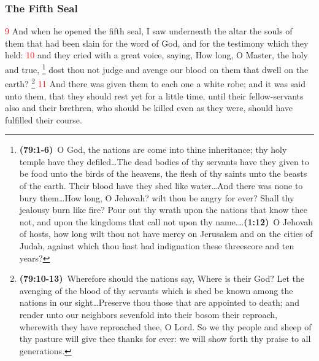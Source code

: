 \documentclass[12pt,twoside]{memoir}
\newcommand{\cbibleref}[3]{\textbf{\ibibleverse{#1}(#2)}\ {#3}}
\newcommand{\cbiblefootduo}[6]{\footnote{\cbibleref{#1}{#2}{#3}\ldots \cbibleref{#4}{#5}{#6}}}
\newcommand{\vnum}[1]{\textcolor{red}{\normalsize{#1}}}
\begin{document}
\subsubsection*{The Fifth Seal}
\vnum{9} And when he opened the fifth seal, I saw underneath the altar the souls of them that had been slain for the word of God, and for the testimony which they held: %
\vnum{10} and they cried with a great voice, saying, How long, O Master, the holy and true,%
	\cbiblefootduo{Psalms}{79:1-6}{O God, the nations are come into thine inheritance; thy holy temple have they defiled\ldots The dead bodies of thy servants have they given to be food unto the birds of the heavens, the flesh of thy saints unto the beasts of the earth. Their blood have they shed like water\ldots And there was none to bury them\ldots How long, O Jehovah? wilt thou be angry for ever? Shall thy jealousy burn like fire? Pour out thy wrath upon the nations that know thee not, and upon the kingdoms that call not upon thy name.}%
				{Zechariah}{1:12}{O Jehovah of hosts, how long wilt thou not have mercy on Jerusalem and on the cities of Judah, against which thou hast had indignation these threescore and ten years?}
 dost thou not judge and avenge our blood on them that dwell on the earth?%
 	\footnote{\cbibleref{Psalms}{79:10-13}{Wherefore should the nations say, Where is their God? Let the avenging of the blood of thy servants which is shed be known among the nations in our sight\ldots Preserve thou those that are appointed to death; and render unto our neighbors sevenfold into their bosom their reproach, wherewith they have reproached thee, O Lord. So we thy people and sheep of thy pasture will give thee thanks for ever: we will show forth thy praise to all generations.}
 	} %
\vnum{11} And there was given them to each one a white robe; and it was said unto them, that they should rest yet for a little time, until their fellow-servants also and their brethren, who should be killed even as they were, should have fulfilled their course.
\end{document}
